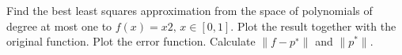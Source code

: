 \begin{problem}
  Find the best least squares approximation from the space of
  polynomials of degree at most one to $f(x) = x 2 ,\, x \in [0, 1]$. Plot
  the result together with the original function. Plot the error
  function. Calculate $\| f − p^∗ \|$ and $\| p^*\|$.
\end{problem}


\begin{solution}

\end{solution}

